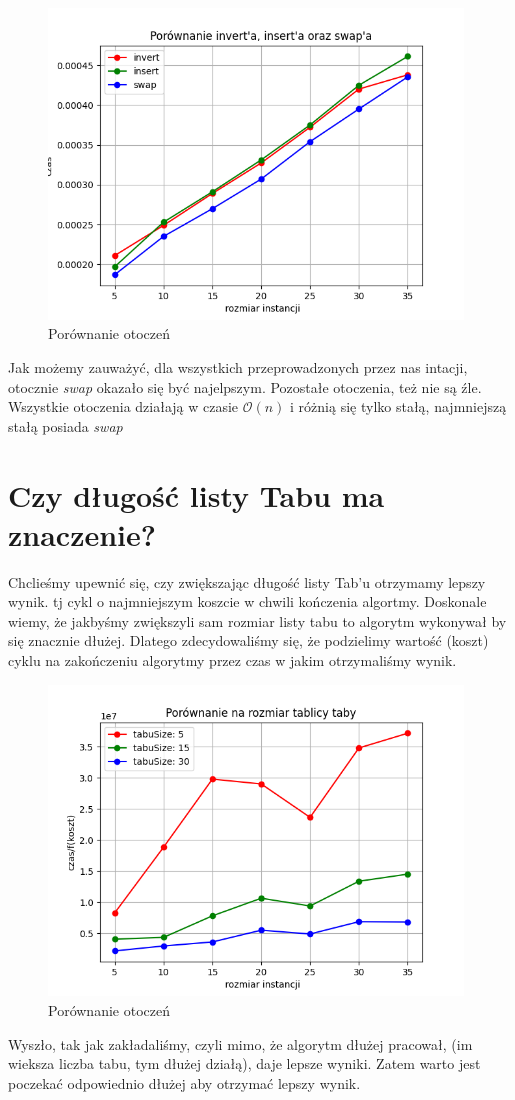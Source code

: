 \documentclass{article}
\begin{document}
    \begin{figure}[h!]
        \centering
        \includegraphics[width=11cm]{./spr2img/Figure_1.png}
        \caption{Porównanie otoczeń}
    \end{figure}

    Jak możemy zauważyć, dla wszystkich przeprowadzonych
    przez nas intacji, otocznie \emph{swap} okazało się być
    najelpszym. Pozostałe otoczenia, też nie są źle. Wszystkie
    otoczenia działają w czasie $\mathcal{O}(n)$ i różnią się tylko
    stałą, najmniejszą stałą posiada \emph{swap}

    \section{Czy długość listy Tabu ma znaczenie? }

    Chclieśmy upewnić się, czy zwiększając długość listy
    Tab'u otrzymamy lepszy wynik. tj cykl o najmniejszym koszcie
    w chwili kończenia algortmy. Doskonale wiemy, że jakbyśmy
    zwiększyli sam rozmiar listy tabu to algorytm wykonywał by
    się znacznie dłużej. Dlatego zdecydowaliśmy się, że podzielimy
    wartość (koszt) cyklu na zakończeniu algorytmy przez czas w jakim
    otrzymaliśmy wynik.

    \begin{figure}[h!]
        \centering
        \includegraphics[width=11cm]{./spr2img/Figure_4.png}
        \caption{Porównanie otoczeń}
    \end{figure}

    Wyszło, tak jak zakładaliśmy, czyli mimo, że algorytm dłużej
    pracował, (im wieksza liczba tabu, tym dłużej działą), daje lepsze
    wyniki. Zatem warto jest poczekać odpowiednio dłużej aby otrzymać
    lepszy wynik.
\end{document}
